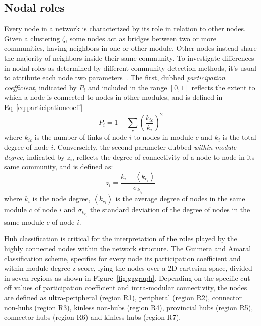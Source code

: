 \subsection{Nodal roles}
Every node in a network is characterized by its role in relation to other nodes. Given a clustering $\zeta$, some nodes act as bridges between two or more communities, having neighbors in one or other module. Other nodes instead share the majority of neighbors inside their same community.
To investigate differences in nodal roles as determined by different community detection methods, it's usual to attribute each node two parameters~\cite{guimera2005}.
The first, dubbed \emph{participation coefficient}, indicated by $P_i$ and included in the range $[0,1]$ reflects the extent to which a node is connected to nodes in other modules, and is defined in Eq~\ref{eq:participationcoeff} 
\begin{equation}\label{eq:participationcoeff}
P_i = 1 - \sum_c \left( \frac{k_{ic}}{k_i} \right)^2
\end{equation}
where $k_{ic}$ is the number of links of node $i$ to nodes in module $c$ and $k_i$ is the total degree of node $i$.
Converselely, the second parameter dubbed \emph{within-module degree}, indicated by $z_i$,  reflects the degree of connectivity of a node to node in its same community, and is defined as: 
\begin{equation}\label{eq:withinmoduledegree}
z_i = \frac{k_i - \left< k_{c_i} \right>}{\sigma_{k_{c_i}}}
\end{equation}
where $k_i$ is the node degree,  $\left< k_{c_i} \right>$ is the average degree of nodes in the same module $c$ of node $i$ and $\sigma_{k_{c_i}}$ the standard deviation of the degree of nodes in the same module $c$ of node $i$.

Hub classification is critical for the interpretation of the roles played by the highly connected nodes within the network structure.
The Guimera and Amaral~\cite{guimera2005} classification scheme, specifies for every node its participation coefficient and within module degree z-score, lying the nodes over a 2D cartesian space, divided in seven regions as shown in Figure~\ref{fig:gagraph}.
Depending on the specific cut-off values of participation coefficient and intra-modular connectivity, the nodes are defined as ultra-peripheral (region R1), peripheral (region R2), connector non-hubs (region R3), kinless non-hubs (region R4), provincial hubs (region R5), connector hubs (region R6) and kinless hubs (region R7). 

